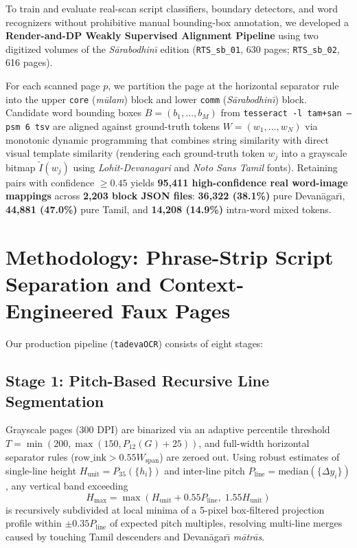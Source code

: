\documentclass[10pt,twocolumn]{article}
\begin{document}
To train and evaluate real-scan script classifiers, boundary detectors, and word recognizers without prohibitive manual bounding-box annotation, we developed a \textbf{Render-and-DP Weakly Supervised Alignment Pipeline} using two digitized volumes of the \emph{S\={a}rabodhin\={\i}} edition (\texttt{RTS\_sb\_01}, 630 pages; \texttt{RTS\_sb\_02}, 616 pages).

For each scanned page $p$, we partition the page at the horizontal separator rule into the upper \texttt{core} (\emph{m\={u}lam}) block and lower \texttt{comm} (\emph{S\={a}rabodhin\={\i}}) block. Candidate word bounding boxes $B = (b_1, \dots, b_M)$ from \texttt{tesseract -l tam+san --psm 6 tsv} are aligned against ground-truth tokens $W = (w_1, \dots, w_N)$ via monotonic dynamic programming that combines string similarity with direct visual template similarity (rendering each ground-truth token $w_j$ into a grayscale bitmap $\tilde{I}(w_j)$ using \emph{Lohit-Devanagari} and \emph{Noto Sans Tamil} fonts). Retaining pairs with confidence $\ge 0.45$ yields \textbf{95,411 high-confidence real word-image mappings} across \textbf{2,203 block JSON files}: \textbf{36,322 (38.1\%)} pure Devan\={a}gar\={\i}, \textbf{44,881 (47.0\%)} pure Tamil, and \textbf{14,208 (14.9\%)} intra-word mixed tokens.

\section{Methodology: Phrase-Strip Script Separation and Context-Engineered Faux Pages}

Our production pipeline (\texttt{tadevaOCR}) consists of eight stages:

\subsection{Stage 1: Pitch-Based Recursive Line Segmentation}
Grayscale pages (300 DPI) are binarized via an adaptive percentile threshold $T = \min(200, \max(150, P_{12}(G) + 25))$, and full-width horizontal separator rules ($\text{row\_ink} > 0.55 W_{\text{span}}$) are zeroed out. Using robust estimates of single-line height $H_{\text{unit}} = P_{35}(\{h_i\})$ and inter-line pitch $P_{\text{line}} = \text{median}(\{\Delta y_i\})$, any vertical band exceeding
\begin{equation}
H_{\max} = \max\left(H_{\text{unit}} + 0.55 P_{\text{line}},\; 1.55 H_{\text{unit}}\right)
\end{equation}
is recursively subdivided at local minima of a 5-pixel box-filtered projection profile within $\pm 0.35 P_{\text{line}}$ of expected pitch multiples, resolving multi-line merges caused by touching Tamil descenders and Devan\={a}gar\={\i} \emph{m\={a}tr\={a}s}.
\end{document}
